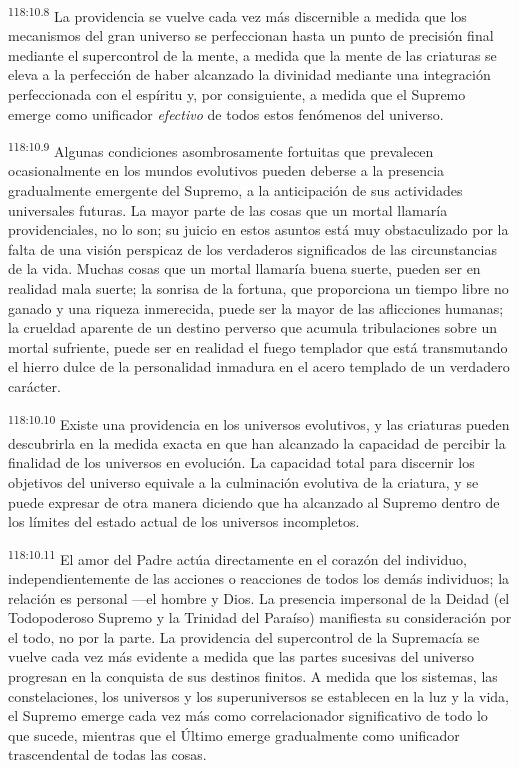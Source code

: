 \documentclass[twoside, 11pt]{book}
\begin{document}
\par
\textsuperscript{118:10.8} La providencia se vuelve cada vez más discernible a medida que los mecanismos del gran universo se perfeccionan hasta un punto de precisión final mediante el supercontrol de la mente, a medida que la mente de las criaturas se eleva a la perfección de haber alcanzado la divinidad mediante una integración perfeccionada con el espíritu y, por consiguiente, a medida que el Supremo emerge como unificador \textit{efectivo} de todos estos fenómenos del universo.

\par
\textsuperscript{118:10.9} Algunas condiciones asombrosamente fortuitas que prevalecen ocasionalmente en los mundos evolutivos pueden deberse a la presencia gradualmente emergente del Supremo, a la anticipación de sus actividades universales futuras. La mayor parte de las cosas que un mortal llamaría providenciales, no lo son; su juicio en estos asuntos está muy obstaculizado por la falta de una visión perspicaz de los verdaderos significados de las circunstancias de la vida. Muchas cosas que un mortal llamaría buena suerte, pueden ser en realidad mala suerte; la sonrisa de la fortuna, que proporciona un tiempo libre no ganado y una riqueza inmerecida, puede ser la mayor de las aflicciones humanas; la crueldad aparente de un destino perverso que acumula tribulaciones sobre un mortal sufriente, puede ser en realidad el fuego templador que está transmutando el hierro dulce de la personalidad inmadura en el acero templado de un verdadero carácter.

\par
\textsuperscript{118:10.10} Existe una providencia en los universos evolutivos, y las criaturas pueden descubrirla en la medida exacta en que han alcanzado la capacidad de percibir la finalidad de los universos en evolución. La capacidad total para discernir los objetivos del universo equivale a la culminación evolutiva de la criatura, y se puede expresar de otra manera diciendo que ha alcanzado al Supremo dentro de los límites del estado actual de los universos incompletos.

\par
\textsuperscript{118:10.11} El amor del Padre actúa directamente en el corazón del individuo, independientemente de las acciones o reacciones de todos los demás individuos; la relación es personal ---el hombre y Dios. La presencia impersonal de la Deidad (el Todopoderoso Supremo y la Trinidad del Paraíso) manifiesta su consideración por el todo, no por la parte. La providencia del supercontrol de la Supremacía se vuelve cada vez más evidente a medida que las partes sucesivas del universo progresan en la conquista de sus destinos finitos. A medida que los sistemas, las constelaciones, los universos y los superuniversos se establecen en la luz y la vida, el Supremo emerge cada vez más como correlacionador significativo de todo lo que sucede, mientras que el Último emerge gradualmente como unificador trascendental de todas las cosas.
\end{document}
